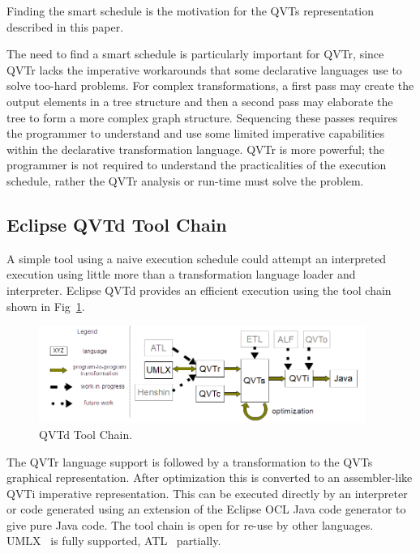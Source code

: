 \documentclass{llncs}
\begin{document}
Finding the smart schedule is the motivation for the QVTs representation described in this paper.

The need to find a smart schedule is particularly important for QVTr, since QVTr lacks the imperative workarounds that some declarative languages use to solve too-hard problems. For complex transformations, a first pass may create the output elements in a tree structure and then a second pass may elaborate the tree to form a more complex graph structure. Sequencing these passes requires the programmer to understand and use some limited imperative capabilities within the declarative transformation language. QVTr is more powerful; the programmer is not required to understand the practicalities of the execution schedule, rather the QVTr analysis or run-time must solve the problem.

\subsection{Eclipse QVTd Tool Chain}

A simple tool using a naive execution schedule could attempt an interpreted execution using little more than a transformation language loader and interpreter. Eclipse QVTd provides an efficient execution using the tool chain shown in Fig~\ref{fig:QVThorizontalAlphabet}.

\begin{figure}[h]
	\centering
	\includegraphics[width=0.95\textwidth]{QVThorizontalAlphabet.png}
	\caption{QVTd Tool Chain.}
	\label{fig:QVThorizontalAlphabet}
\end{figure}

The QVTr language support is followed by a transformation to the QVTs graphical representation. After optimization this is converted to an assembler-like QVTi imperative representation. This can be executed directly by an interpreter or code generated using an extension of the Eclipse OCL Java code generator to give pure Java code. The tool chain is open for re-use by other languages. UMLX~\cite{UMLX} is fully supported, ATL~\cite{Eclipse-ATL} partially.
\end{document}
